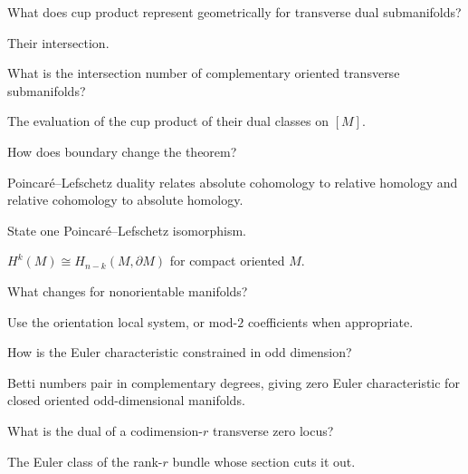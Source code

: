 \begin{problem}
What does cup product represent geometrically for transverse dual submanifolds?
\end{problem}
\begin{solution}
Their intersection.
\end{solution}

\begin{problem}
What is the intersection number of complementary oriented transverse submanifolds?
\end{problem}
\begin{solution}
The evaluation of the cup product of their dual classes on $[M]$.
\end{solution}

\begin{problem}
How does boundary change the theorem?
\end{problem}
\begin{solution}
Poincaré--Lefschetz duality relates absolute cohomology to relative homology and relative cohomology to absolute homology.
\end{solution}

\begin{problem}
State one Poincaré--Lefschetz isomorphism.
\end{problem}
\begin{solution}
$H^k(M)\cong H_{n-k}(M,\partial M)$ for compact oriented $M$.
\end{solution}

\begin{problem}
What changes for nonorientable manifolds?
\end{problem}
\begin{solution}
Use the orientation local system, or mod-$2$ coefficients when appropriate.
\end{solution}

\begin{problem}
How is the Euler characteristic constrained in odd dimension?
\end{problem}
\begin{solution}
Betti numbers pair in complementary degrees, giving zero Euler characteristic for closed oriented odd-dimensional manifolds.
\end{solution}

\begin{problem}
What is the dual of a codimension-$r$ transverse zero locus?
\end{problem}
\begin{solution}
The Euler class of the rank-$r$ bundle whose section cuts it out.
\end{solution}

